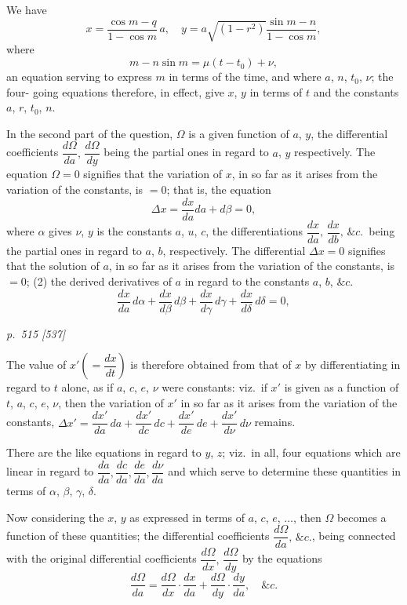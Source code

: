 \documentclass[11pt,a4paper]{book}
\begin{document}
We have
\[
x = \frac{\cos m - q}{1 - \cos m}\,a, \quad y = a\sqrt{(1 - r^2)}\frac{\sin m - n}{1 - \cos m},
\]
where
\[
m - n\sin m = \mu(t - t_0) + \nu,
\]
an equation serving to express $m$ in terms of the time, and where $a$, $n$, $t_0$, $\nu$; the four-
going equations therefore, in effect, give $x$, $y$ in terms of $t$ and the constants $a$, $r$, $t_0$, $n$.

In the second part of the question, $\Omega$ is a given function of $a$, $y$, the differential
coefficients $\dfrac{d\Omega}{da},\, \dfrac{d\Omega}{dy}$ being the partial ones in regard to $a$, $y$ respectively. The equation
$\Omega = 0$ signifies that the variation of $x$, in so far as it arises from the variation
of the constants, is $= 0$; that is, the equation
\[
\Delta x = \frac{dx}{da}d a + d\beta = 0,
\]
where $\alpha$ gives $\nu$, $y$ is the constants $a$, $u$, $c$, the differentiations
$\dfrac{dx}{da},\, \dfrac{dx}{db},\, \&c.$\, being the partial ones in regard to $a$, $b$, respectively. The differential
$\Delta x = 0$ signifies that the solution of $a$, in so far as it arises from the variation
of the constants, is $= 0$; (2) the derived derivatives of $a$ in regard to the
constants $a$, $b$, $\&c.$
\[
\frac{dx}{da}\,d\alpha + \frac{dx}{d\beta}\,d\beta + \frac{dx}{d\gamma}\,d\gamma + \frac{dx}{d\delta}\,d\delta = 0,
\]

\clearpage

\bigskip
\textit{p.~515 [537]}
\smallskip

\noindent
The value of $x'\left(=\dfrac{dx}{dt}\right)$ is therefore obtained from that of $x$ by differentiating in
regard to $t$ alone, as if $a$, $c$, $e$, $\nu$ were constants: viz.\ if $x'$ is given as a function
of $t$, $a$, $c$, $e$, $\nu$, then the variation of $x'$ in so far as it arises from the variation
of the constants, $\Delta x' = \dfrac{dx'}{da}\,da + \dfrac{dx'}{dc}\,dc + \dfrac{dx'}{de}\,de + \dfrac{dx'}{d\nu}\,d\nu$ remains.

There are the like equations in regard to $y$, $z$; viz.\ in all, four equations which are
linear in regard to $\dfrac{da}{da}, \dfrac{dc}{da}, \dfrac{de}{da}, \dfrac{d\nu}{da}$ and which serve to determine these quantities in
terms of $\alpha,\,\beta,\,\gamma,\,\delta$.

Now considering the $x$, $y$ as expressed in terms of $a$, $c$, $e$, $\ldots$, then $\Omega$ becomes
a function of these quantities; the differential coefficients $\dfrac{d\Omega}{da},\, \&c.$, being connected
with the original differential coefficients $\dfrac{d\Omega}{dx},\, \dfrac{d\Omega}{dy}$ by the equations
\[
\frac{d\Omega}{da} = \frac{d\Omega}{dx} \cdot \frac{dx}{da} + \frac{d\Omega}{dy} \cdot \frac{dy}{da}, \quad \&c.
\]
\end{document}
